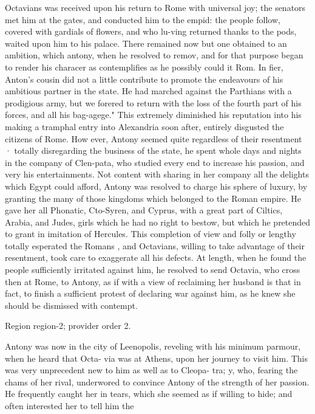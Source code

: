 \documentclass[11pt]{article}
\begin{document}
Octavians was received upon his return to Rome with universal joy; the senators met him at the gates, and conducted him to the empid: the people follow, covered with gardials of flowers, and who lu-ving returned thanks to the pods, waited upon him to his palace. There remained now but one obtained to an ambition, which antony, when he resolved to remov, and for that purpose began to render his characer as contemplifies as he possibly could it Rom. In fier, Anton’s cousin did not a little contribute to promote the endeavours of his ambitious partner in the state. He had marched against the Parthians with a prodigious army, but we forered to return with the loss of the fourth part of his forces, and all his bag-agege." This extremely diminished his reputation into his making a tramphal entry into Alexandria soon after, entirely disgusted the citizens of Rome. How ever, Antony seemed quite regardless of their resentment · totally disregarding the business of the state, he spent whole days and nights in the company of Clen-pata, who studied every end to increase his passion, and very his entertainments. Not content with sharing in her company all the delights which Egypt could afford, Antony was resolved to charge his sphere of luxury, by granting the many of those kingdoms which belonged to the Roman empire. He gave her all Phonatic, Cto-Syren, and Cyprus, with a great part of Ciltics, Arabia, and Judes, girls which he had no right to bestow, but which he pretended to grant in imitation of Hercules. This completion of view and folly or lengthy totally esperated the Romans , and Octavians, willing to take advantage of their resentment, took care to exaggerate all his defects. At length, when he found the people sufficiently irritated against him, he resolved to send Octavia, who cross then at Rome, to Antony, as if with a view of reclaiming her husband is that in fact, to finish a sufficient protest of declaring war against him, as he knew she should be dismissed with contempt.
\par

{\scriptsize\color{gray} Region region-2; provider order 2.\par}
\medskip

Antony was now in the city of Leenopolis, reveling with his minimum parmour, when he heard that Octa- via was at Athens, upon her journey to visit him. This was very unprecedent new to him as well as to Cleopa- tra; y, who, fearing the chams of her rival, underwored to convince Antony of the strength of her passion. He frequently caught her in tears, which she seemed as if willing to hide; and often interested her to tell him the
\par
\end{document}

